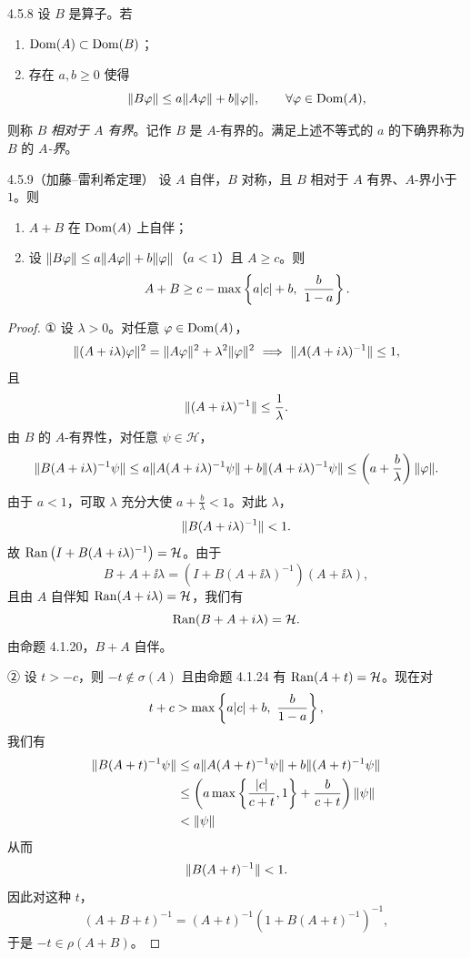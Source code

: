 \begin{definition}{4.5.8}
  设 $B$ 是算子。若
  \begin{enumerate}[label=(\arabic*),leftmargin=3.2em,itemsep=1pt]
    \item $\operatorname{Dom}(A)\subset\operatorname{Dom}(B)$；
    \item 存在 $a,b\ge0$ 使得
    \[
    \lVert B\varphi\rVert\le a\lVert A\varphi\rVert+b\lVert \varphi\rVert,\qquad\forall\varphi\in\operatorname{Dom}(A),
    \]
  \end{enumerate}
  则称 $B$ \emph{相对于 $A$ 有界}。记作 $B$ 是 $A$-有界的。满足上述不等式的 $a$ 的下确界称为 $B$ 的 \emph{$A$-界}。
\end{definition}

\begin{theorem}{4.5.9}（加藤–雷利希定理）
  设 $A$ 自伴，$B$ 对称，且 $B$ 相对于 $A$ 有界、$A$-界小于 $1$。则
  \begin{enumerate}[label=(\arabic*),leftmargin=3.2em,itemsep=1pt]
    \item $A+B$ 在 $\operatorname{Dom}(A)$ 上自伴；
    \item 设 $\lVert B\varphi\rVert\le a\lVert A\varphi\rVert+b\lVert \varphi\rVert$（$a<1$）且 $A\ge c$。则
    \[
    A+B\ge c-\max\left\{a\abs{c}+b,\ \frac{b}{1-a}\right\}.
    \]
  \end{enumerate}
\end{theorem}

\begin{proof}
  ① 设 $\lambda>0$。对任意 $\varphi\in\operatorname{Dom}(A)$，
  \[
  \lVert (A+i\lambda)\varphi\rVert^2=\lVert A\varphi\rVert^2+\lambda^2\lVert \varphi\rVert^2
  \ \Longrightarrow\
  \lVert A(A+i\lambda)^{-1}\rVert\le1,
  \]
  且
  \[
  \lVert (A+i\lambda)^{-1}\rVert\le\frac{1}{\lambda}.
  \]
  由 $B$ 的 $A$-有界性，对任意 $\psi\in\mathcal{H}$，
  \[
  \lVert B(A+i\lambda)^{-1}\psi\rVert
  \le a\lVert A(A+i\lambda)^{-1}\psi\rVert+b\lVert (A+i\lambda)^{-1}\psi\rVert
  \le\left(a+\frac{b}{\lambda}\right)\lVert \varphi\rVert.
  \]
  由于 $a<1$，可取 $\lambda$ 充分大使 $a+\frac{b}{\lambda}<1$。对此 $\lambda$，
  \[
  \lVert B(A+i\lambda)^{-1}\rVert<1.
  \]
  故 $\operatorname{Ran}\left(I+B(A+i\lambda)^{-1}\right)=\mathcal{H}$。由于
  \[
  B+A+\ii\lambda=\left(I+B(A+\ii\lambda)^{-1}\right)(A+\ii\lambda),
  \]
  且由 $A$ 自伴知 $\operatorname{Ran}(A+i\lambda)=\mathcal{H}$，我们有
  \[
  \operatorname{Ran}(B+A+i\lambda)=\mathcal{H}.
  \]
  由命题 4.1.20，$B+A$ 自伴。

  ② 设 $t>-c$，则 $-t\notin\sigma(A)$ 且由命题 4.1.24 有 $\operatorname{Ran}(A+t)=\mathcal{H}$。现在对
  \[
  t+c>\max\left\{a\abs{c}+b,\ \frac{b}{1-a}\right\},
  \]
  我们有
  \begin{align*}
  \lVert B(A+t)^{-1}\psi\rVert
  &\le a\lVert A(A+t)^{-1}\psi\rVert+b\lVert (A+t)^{-1}\psi\rVert\\
  &\le\left(a\max\left\{\frac{\lvert c\rvert}{c+t},1\right\}+\frac{b}{c+t}\right)\lVert \psi\rVert\\
  &<\lVert \psi\rVert
  \end{align*}
  从而
  \[
  \lVert B(A+t)^{-1}\rVert<1.
  \]
  因此对这种 $t$，
  \[
  (A+B+t)^{-1}=(A+t)^{-1}\left(1+B(A+t)^{-1}\right)^{-1},
  \]
  于是 $-t\in\rho(A+B)$。
\end{proof}


